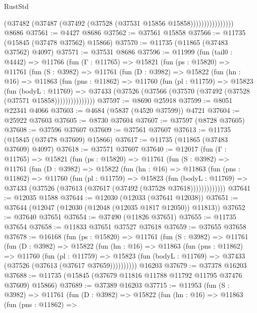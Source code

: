 \begin{lexlean}{RustStd}
\begin{coremodule}
                          (@37482 (@37487 (@37492 (@37528 (@37531 @15856 @15858))))))))))))))))
    @8686
@37561 := @4427 @8686
@37562 := @37561 @15858
@37566 := @11735 (@15845 (@37478 @37562) @15866)
@37570 := @11735 (@11865 (@37483 @37562) @4097)
@37571 := @37531 @8686
@37596 := @11999
    (fun (tail0 : @4442) =>
    @11766
      (fun (Γ : @11765) =>
      @15821
        (fun (ps : @15820) =>
        @11761
          (fun (S : @3982) =>
          @11761
            (fun (D : @3982) =>
            @15822
              (fun (hn : @16) =>
              @11863
                (fun (pns : @11862) =>
                @11760
                  (fun (pl : @11759) =>
                  @15823
                    (fun (bodyL : @11769) =>
                    @37433 (@37526 (@37566 (@37570 (@37492 (@37528 (@37571 @15858)))))))))))))))
@37597 := @8690 @25918
@37599 := @8051 @22341 @4066
@37603 := @4684 (@5837 (@4520 @37599)) @4721
@37604 := @25922 @37603
@37605 := @8730 @37604
@37607 := @37597 (@8728 @37605)
@37608 := @37596 @37607
@37609 := @37561 @37607
@37613 := @11735 (@15845 (@37478 @37609) @15866)
@37617 := @11735 (@11865 (@37483 @37609) @4097)
@37618 := @37571 @37607
@37640 := @12017
    (fun (Γ : @11765) =>
    @15821
      (fun (ps : @15820) =>
      @11761
        (fun (S : @3982) =>
        @11761
          (fun (D : @3982) =>
          @15822
            (fun (hn : @16) =>
            @11863
              (fun (pns : @11862) =>
              @11760
                (fun (pl : @11759) =>
                @15823
                  (fun (bodyL : @11769) =>
                  @37433 (@37526 (@37613 (@37617 (@37492 (@37528 @37618)))))))))))))
@37641 := @12035 @1588
@37644 := @12030 (@12033 (@37641 @12038))
@37651 := @37644 (@12047 (@12030 (@12048 (@12035 @1817 @12050)) @11813))
@37652 := @37640 @37651
@37654 := @37490 (@11826 @37651)
@37655 := @11735 @37654
@37658 := @11833 @37651 @37527 @37618
@37659 := @37655 @37658
@37678 := @16168
    (fun (ps : @15820) =>
    @11761
      (fun (S : @3982) =>
      @11761
        (fun (D : @3982) =>
        @15822
          (fun (hn : @16) =>
          @11863
            (fun (pns : @11862) =>
            @11760
              (fun (pl : @11759) =>
              @15823 (fun (bodyL : @11769) => @37433 (@37526 (@37613 (@37617 @37659))))))))))
    @16203
@37679 := @37378 @16203
@37688 := @11735 (@15845 (@37679 @11816 @11788 @11792 @11795 @37476 @37609) @15866)
@37689 := @37389 @16203
@37715 := @11953
    (fun (S : @3982) =>
    @11761
      (fun (D : @3982) =>
      @15822
        (fun (hn : @16) =>
        @11863
          (fun (pns : @11862) =>

\end{coremodule}
\end{lexlean}
